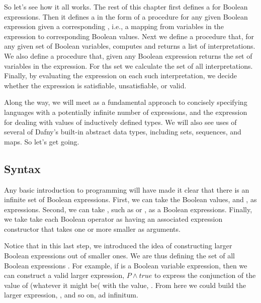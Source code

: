 \documentclass[letterpaper,10pt,english]{sphinxmanual}
\begin{document}
So let’s see how it all works. The rest of this chapter first defines
a  for Boolean expressions. Then it defines a  in
the form of a procedure for  any given Boolean expression
given a corresponding , i.e., a mapping from variables
in the expression to corresponding Boolean values. Next we define a
procedure that, for any given set of Boolean variables, computes and
returns a list of  interpretations. We also define a procedure
that, given any Boolean expression returns the set of variables in the
expression. For ths set we calculate the set of all interpretations.
Finally, by evaluating the expression on each such interpretation, we
decide whether the expression is satisfiable, unsatisfiable, or valid.

Along the way, we will meet  as a fundamental
approach to concisely specifying languages with a potentially infinite
number of expressions, and the  expression for dealing with
values of inductively defined types. We will also see uses of several
of Dafny’s built-in abstract data types, including sets, sequences,
and maps. So let’s get going.


\subsection{Syntax}
\label{\detokenize{09-propositional-logic:syntax}}
Any basic introduction to programming will have made it clear that
there is an infinite set of Boolean expressions. First, we can take
the Boolean values,  and , as  expressions.
Second, we can take , such as  or , as a
Boolean  expressions. Finally, we take take each Boolean
operator as having an associated expression constructor that takes one
or more smaller  as arguments.

Notice that in this last step, we introduced the idea of constructing
larger Boolean expressions out of smaller ones. We are thus defining
the set of all Boolean expressions . For example, if 
is a Boolean variable expression, then we can construct a valid larger
expression, \(P \land true\) to express the conjunction of the
value of  (whatever it might be( with the value, . From here
we could build the larger expression, , and so
on, ad infinitum.
\end{document}
